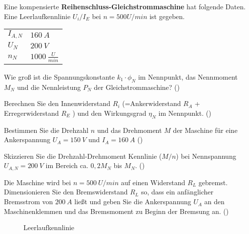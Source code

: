 \begin{question}[section=2,name={18.1.2017},mode=exm,type=bsp,tags={20170118}]
	Eine kompensierte \textbf{Reihenschluss-Gleichstrommaschine} hat folgende Daten. Eine Leerlaufkennlinie $U_i/I_E$ bei $n=500 U/min$ ist gegeben.\\
	\begin{tabular}{L{2cm}l}
		$I_{A,N}$ \dotfill &$160~A$\\
		$U_{N}$ \dotfill & $200~V$ \\
		$n_N$ \dotfill & $1000~\frac{U}{min}$\\
	\end{tabular}
	\begin{compactenum}
		\item Wie groß ist die Spannungskonstante $k_1 \cdot \phi_N$ im Nennpunkt, das Nennmoment $M_N$ und die Nennleistung $P_N$ der Gleichstrommaschine? ()
		\item Berechnen Sie den Innenwiderstand $R_i$ (=Ankerwiderstand $R_A$ + Erregerwiderstand $R_E$ ) und den Wirkungsgrad $\eta_N$ im Nennpunkt. ()
		\item Bestimmen Sie die Drehzahl $n$ und das Drehmoment $M$ der Maschine für eine Ankerspannung $U_A =150~V$ und $I_A = 160~A$ ()
		\item Skizzieren Sie die Drehzahl-Drehmoment Kennlinie ($M/n$) bei Nennspannung $U_{A,N}=200~V$ im Bereich ca. $0,2M_N$ bis $M_N$. ()
		\item Die Maschine wird bei $n=500~U/min$ auf einen Widerstand $R_L$ gebremst. Dimensionieren Sie den Bremswiderstand $R_L$ so, dass ein anfänglicher Bremsstrom von $200~A$ ließt und geben Sie die Ankerspannung $U_A$ an den Maschinenklemmen und das Bremsmoment zu Beginn der Bremsung an. ()
	\end{compactenum}
	\begin{figure}[H]
		\caption{Leerlaufkennlinie} \label{fig:20170118}
	\end{figure}
\end{question}
\begin{solution}
	
\end{solution}